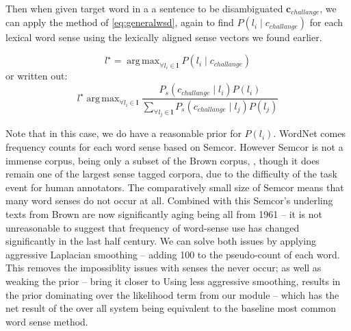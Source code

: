 \documentclass{sig-alternate}
\renewcommand{\c}{\mathbf{c}}
\renewcommand{\l}{\mathbf{l}}
\DeclareMathOperator*{\argmax}{arg\,max}
\begin{document}
Then when given target word in a a sentence to be disambiguated $\c_{challange}$, we can apply the method of \cref{eq:generalwsd}, again to find $P(l_i \mid c_{challange})$ for each lexical word sense using the lexically aligned sense vectors we found earlier.

\begin{equation}\label{eq:lexicalwsd}
l^\star = \argmax_{\forall l_i \in \l} P(l_i \mid c_{challange})
\end{equation}
or written out:
\begin{equation}\label{eq:lexicalwsdexpanded}
l^\star \argmax_{\forall l_i \in \l} \frac{P_s(c_{challange} \mid l_i)P(l_i)}{\sum_{\forall l_j \in \l} P_s(c_{challange} \mid l_j)P(l_j)}
\end{equation}

Note that in this case, we do have a reasonable prior for $P(l_i)$.
WordNet comes frequency counts for each word sense based on Semcor\cite{tengi1998design}.
However Semcor is not a immense corpus, being only a subset of the Brown corpus, , though it does remain one of the largest sense tagged corpora, due to the difficulty of the task event for human annotators.
The comparatively small size of Semcor means that many word senses do not occur at all.
Combined with this Semcor's underling texts from Brown are now significantly aging being all from 1961 -- it is not unreasonable to suggest that frequency of word-sense use has changed significantly in the last half century.
We can solve both issues by applying aggressive Laplacian smoothing -- adding 100 to the pseudo-count of each word. This removes the impossiblity issues with senses the never occur; as well as weaking the prior -- bring it closer to 
Using less aggressive smoothing, results in the prior dominating over the likelihood term from our module -- which has the net result of the over all system being equivalent to the baseline most common word sense method.





\printbibliography
\end{document}
